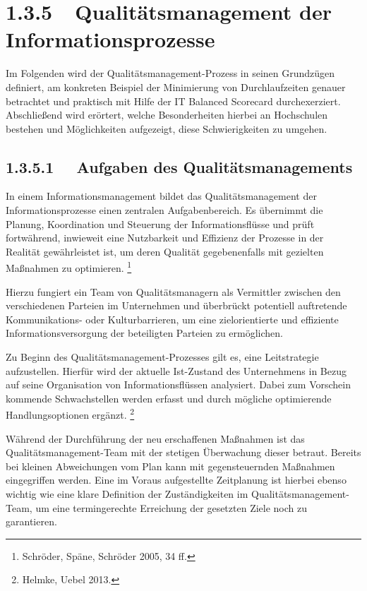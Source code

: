 \documentclass[a4paper]{article}
\title{}
\begin{document}
\section[1.3.5\ \ Qualitätsmanagement der Informationsprozesse]{1.3.5\ \ Qualitätsmanagement der Informationsprozesse}
{\sffamily
Im Folgenden wird der Qualitätsmanagement-Prozess in seinen Grundzügen definiert, am konkreten Beispiel der Minimierung
von Durchlaufzeiten genauer betrachtet und praktisch mit Hilfe der IT Balanced Scorecard durchexerziert. Abschließend
wird erörtert, welche Besonderheiten hierbei an Hochschulen bestehen und Möglichkeiten aufgezeigt, diese
Schwierigkeiten zu umgehen. }

\subsection[1.3.5.1 \ \ Aufgaben des Qualitätsmanagements ]{1.3.5.1 \ \ Aufgaben des Qualitätsmanagements }
{\sffamily
In einem Informationsmanagement bildet das Qualitätsmanagement der Informationsprozesse einen zentralen Aufgabenbereich.
Es übernimmt die Planung, Koordination und Steuerung der Informationsflüsse und prüft fortwährend, inwieweit eine
Nutzbarkeit und Effizienz der Prozesse in der Realität gewährleistet ist, um deren Qualität gegebenenfalls mit
gezielten Maßnahmen zu optimieren. \footnote{Schröder, Späne, Schröder 2005, 34 ff.}}


\bigskip

{\sffamily
Hierzu fungiert ein Team von Qualitätsmanagern als Vermittler zwischen den verschiedenen Parteien im Unternehmen und
überbrückt potentiell auftretende Kommunikations- oder Kulturbarrieren, um eine zielorientierte und effiziente
Informationsversorgung der beteiligten Parteien zu ermöglichen. }


\bigskip

{\sffamily
Zu Beginn des Qualitätsmanagement-Prozesses gilt es, eine Leitstrategie aufzustellen. Hierfür wird der aktuelle
Ist-Zustand des Unternehmens in Bezug auf seine Organisation von Informationsflüssen analysiert. Dabei zum Vorschein
kommende Schwachstellen werden erfasst und durch mögliche optimierende Handlungsoptionen ergänzt. \footnote{Helmke,
Uebel 2013.}}


\bigskip

{\sffamily
Während der Durchführung der neu erschaffenen Maßnahmen ist das Qualitätsmanagement-Team mit der stetigen Überwachung
dieser betraut. Bereits bei kleinen Abweichungen vom Plan kann mit gegensteuernden Maßnahmen eingegriffen werden. Eine
im Voraus aufgestellte Zeitplanung ist hierbei ebenso wichtig wie eine klare Definition der Zuständigkeiten im
Qualitätsmanagement-Team, um eine termingerechte Erreichung der gesetzten Ziele noch zu garantieren.}
\end{document}
